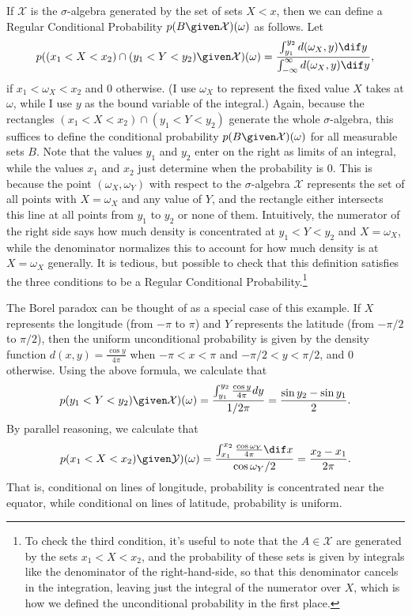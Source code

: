 If $\mathcal{X}$ is the $\sigma$-algebra generated by the set of sets $X<x$, then we can define a Regular Conditional Probability $p(B \given \mathcal{X})(\omega)$ as follows. Let
$$p((x_1<X<x_2)\cap(y_1<Y<y_2) \given \mathcal{X})(\omega)=\frac{\int_{y_1}^{y_2}d(\omega_X,y) \dif y}{\int_{-\infty}^{\infty}d(\omega_X,y) \dif y},$$
if $x_1<\omega_X<x_2$ and $0$ otherwise. (I use $\omega_X$ to represent the fixed value $X$ takes at $\omega$, while I use $y$  as the bound variable of the integral.) Again, because the rectangles $(x_1<X<x_2)\cap(y_1<Y<y_2)$ generate the whole $\sigma$-algebra, this suffices to define the conditional probability $p(B \given \mathcal{X})(\omega)$ for all measurable sets $B$. Note that the values $y_1$ and $y_2$ enter on the right as limits of an integral, while the values $x_1$ and $x_2$ just determine when the probability is $0$. This is because the point $(\omega_X,\omega_Y)$ with respect to the $\sigma$-algebra $\mathcal{X}$ represents the set of all points with $X=\omega_X$ and any value of $Y$, and the rectangle either intersects this line at all points from $y_1$ to $y_2$ or none of them. Intuitively, the numerator of the right side says how much density is concentrated at $y_1<Y<y_2$ and $X=\omega_X$, while the denominator normalizes this to account for how much density is at $X=\omega_X$ generally. It is tedious, but possible to check that this definition satisfies the three conditions to be a Regular Conditional Probability.\footnote{To check the third condition, it's useful to note that the $A\in\mathcal{X}$ are generated by the sets $x_1<X<x_2$, and the probability of these sets is given by integrals like the denominator of the right-hand-side, so that this denominator cancels in the integration, leaving just the integral of the numerator over $X$, which is how we defined the unconditional probability in the first place.}

The Borel paradox can be thought of as a special case of this example. If $X$ represents the longitude (from $-\pi$ to $\pi$) and $Y$ represents the latitude (from $-\pi/2$ to $\pi/2$), then the uniform unconditional probability is given by the density function $d(x,y)=\frac{\cos y}{4\pi}$ when $-\pi<x<\pi$ and $-\pi/2<y<\pi/2$, and $0$ otherwise. Using the above formula, we calculate that
$$p(y_1<Y<y_2) \given \mathcal{X})(\omega)=\frac{\int_{y_1}^{y_2}\frac{\cos y}{4\pi}dy}{1/2\pi}=\frac{\sin y_2-\sin y_1}{2}.$$
By parallel reasoning, we calculate that
$$p(x_1<X<x_2) \given \mathcal{Y})(\omega)=\frac{\int_{x_1}^{x_2}\frac{\cos \omega_Y}{4\pi} \dif x}{\cos\omega_Y/2}=\frac{x_2-x_1}{2\pi}.$$
That is, conditional on lines of longitude, probability is concentrated near the equator, while conditional on lines of latitude, probability is uniform.

